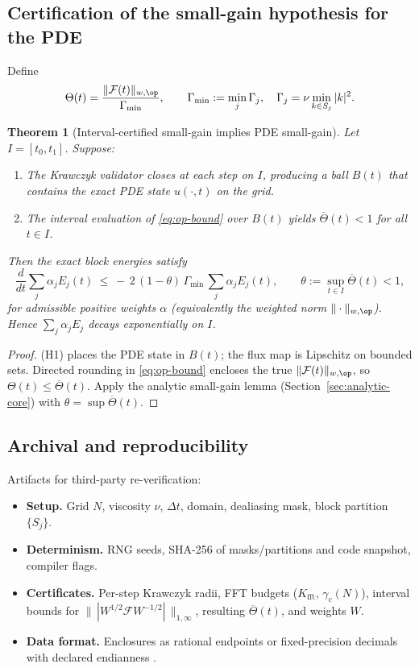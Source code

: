 \IfFileExists{nyjm.cls}{\documentclass[11pt]{nyjm}}{\documentclass[11pt]{amsart}}
\theoremstyle{plain}
\newtheorem{theorem}{Theorem}[section]
\theoremstyle{definition}
\theoremstyle{remark}
\begin{document}
\subsection{Certification of the small-gain hypothesis for the PDE}\label{subsec:cav-theta}
Define
\[
\Theta(t)=\frac{\|\mathcal F(t)\|_{w,\op}}{\Gamma_{\min}},\qquad
\Gamma_{\min}:=\min_j\Gamma_j,\quad \Gamma_j=\nu\min_{k\in S_j}|k|^2.
\]

\begin{theorem}[Interval-certified small-gain implies PDE small-gain]\label{thm:cav}
Let $I=[t_0,t_1]$. Suppose:
\begin{enumerate}[label=(H\arabic*)]
\item The Krawczyk validator closes at each step on $I$, producing a ball $B(t)$ that contains the exact PDE state $u(\cdot,t)$ on the grid.
\item The interval evaluation of \eqref{eq:op-bound} over $B(t)$ yields $\overline{\Theta}(t)<1$ for all $t\in I$.
\end{enumerate}
Then the exact block energies satisfy
\[
\frac{d}{dt}\sum_j \alpha_j E_j(t)\ \le\ -\,2\,(1-\theta)\,\Gamma_{\min}\,\sum_j \alpha_j E_j(t),\qquad
\theta:=\sup_{t\in I}\overline{\Theta}(t)<1,
\]
for admissible positive weights $\alpha$ (equivalently the weighted norm $\|\cdot\|_{w,\op}$). Hence $\sum_j \alpha_j E_j$ decays exponentially on $I$.
\end{theorem}

\begin{proof}
(H1) places the PDE state in $B(t)$; the flux map is Lipschitz on bounded sets. Directed rounding in \eqref{eq:op-bound} encloses the true $\|\mathcal F(t)\|_{w,\op}$, so $\Theta(t)\le\overline{\Theta}(t)$. Apply the analytic small-gain lemma (Section~\ref{sec:analytic-core}) with $\theta=\sup\overline{\Theta}(t)$.
\end{proof}

\subsection{Archival and reproducibility}\label{subsec:cav-archival}
Artifacts for third-party re-verification:
\begin{itemize}
\item \textbf{Setup.} Grid $N$, viscosity $\nu$, $\Delta t$, domain, dealiasing mask, block partition $\{S_j\}$.
\item \textbf{Determinism.} RNG seeds, SHA-256 of masks/partitions and code snapshot, compiler flags.
\item \textbf{Certificates.} Per-step Krawczyk radii, FFT budgets ($K_{\mathrm{fft}}$, $\gamma_c(N)$), interval bounds for $\|\,|W^{1/2}\mathcal F W^{-1/2}|\,\|_{1,\infty}$, resulting $\overline{\Theta}(t)$, and weights $W$.
\item \textbf{Data format.} Enclosures as rational endpoints or fixed-precision decimals with declared endianness \cite{Tucker2011}.
\end{itemize}
\end{document}
